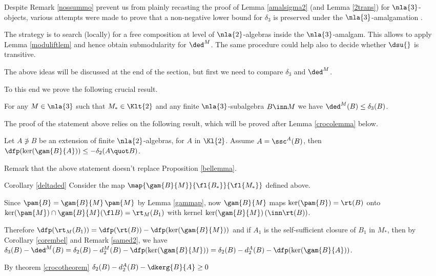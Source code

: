 Despite Remark \ref{nossummo} prevent us from plainly recasting the proof of Lemma \ref{amalsigma2} (and
Lemma \ref{2trans}) for $\nla{3}$-objects,
various attempts were made to prove that a non-negative lower bound for $\delta_{3}$ is preserved under the $\nla{3}$-amalgamation
.

The strategy is to search (locally) for a free composition at level of $\nla{2}$-algebras inside the $\nla{3}$-amalgam.
This allows to apply Lemma \ref{moduliftlem} and hence obtain submodularity for $\ded^{M}$. The same procedure
could help also to decide whether $\dsu{}$ is transitive.

The above ideas will be discussed at the end of the section, but first we need to compare $\delta_{3}$ and $\ded^{M}$.

\smallskip
To this end we prove the following crucial result.
\begin{cor}\label{deltaded}
For any $M\in\nla{3}$ such that $M_{*}\in\Klt{2}$ and any finite $\nla{3}$-subalgebra $B\inn M$ %
we have $\ded^{M}(B)\leq\delta_{3}(B)$.
\end{cor}
The proof of the statement above relies on the following result, which will be proved after Lemma \ref{crocolemma} below.
\begin{teo}\label{crocotheorem}
Let $A\nni B$ be an extension of  finite $\nla{2}$-algebras, for $A$ in $\Kl{2}$. Assume $A=\ssc^{A}(B)$, then
$\dfp(\ker(\gam{B}{A}))\leq-\delta_{2}(A\quot B)$.
\end{teo}
Remark that the above statement doesn't replace Proposition \ref{bellemma}.

\begin{proofof}{Corollary \ref{deltaded}}
Consider the map $\map{\gam{B}{M}}{\fl{B_{*}}}{\fl{M_{*}}}$ defined above.

Since $\pam{B}=\gam{B}{M}\,\pam{M}$ by Lemma \ref{gammap}, now $\gam{B}{M}$ maps
$\ker(\pam{B})=\rt(B)$ onto $\ker(\pam{M})\cap\gam{B}{M}(\fl B)=\rt_{M}(B_{1})$
with kernel $\ker(\gam{B}{M})\,(\inn\rt(B))$.

Therefore $\dfp(\rt_{M}(B_{1}))=\dfp(\rt(B))-\dfp(\ker(\gam{B}{M}))$ and if $A_{1}$ is the self-sufficient closure
of $B_{1}$ in $M_{*}$, then by Corollary \ref{corembel} and Remark \ref{samed2}, we have
$\delta_{3}(B)-\ded^{M}(B)=\delta_{2}(B)-d_{2}^{M}(B)-\dfp(\ker(\gam{B}{M}))=\delta_{2}(B)-d_{2}^{A}(B)-\dfp(\ker(\gam{B}{A}))$.

By theorem \ref{crocotheorem} $\delta_{2}(B)-d_{2}^{A}(B)-\dkerg{B}{A}\geq0$
\end{proofof}